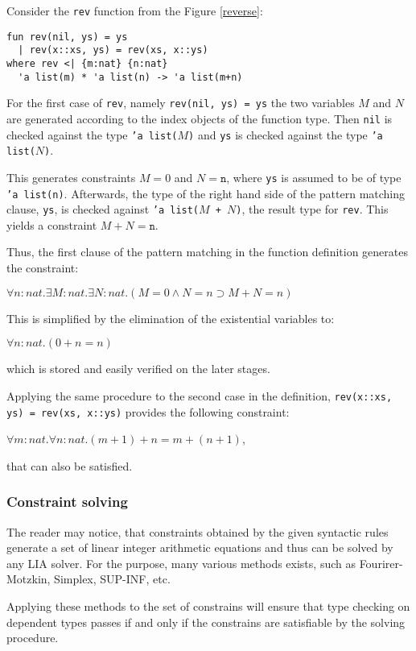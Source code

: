 \documentclass[a4paper,UKenglish]{lipics-v2016}
\begin{document}
Consider the \texttt{rev} function from the Figure \ref{reverse}:
\begin{verbatim}
fun rev(nil, ys) = ys
  | rev(x::xs, ys) = rev(xs, x::ys)
where rev <| {m:nat} {n:nat}
  'a list(m) * 'a list(n) -> 'a list(m+n)
\end{verbatim}

For the first case of \texttt{rev}, namely \texttt{rev(nil, ys) = ys} the two
variables $M$ and $N$ are generated according to the index objects of the
function type.  Then \texttt{nil} is checked against the type \texttt{'a
list($M$)} and \texttt{ys} is checked against the type \texttt{'a list($N$)}.

This generates constraints $M = 0$ and $N = \texttt{n}$, where \texttt{ys} is
assumed to be of type \texttt{'a list(n)}. Afterwards, the type of the right
hand side of the pattern matching clause, \texttt{ys}, is checked against
\texttt{'a list($M$ + $N$)}, the result type for \texttt{rev}. This yields a
constraint $M + N = \texttt{n}$.

Thus, the first clause of the pattern matching in the function definition
generates the constraint:

$\forall n : nat. \exists M : nat. \exists N : nat. (M = 0 \land N = n \supset M + N = n)$

This is simplified by the elimination of the existential variables to:

$\forall n : nat. (0 + n = n)$

which is stored and easily verified on the later stages.

Applying the same procedure to the second case in the definition,
\texttt{rev(x::xs, ys) = rev(xs, x::ys)} provides the following constraint:

$\forall m : nat. \forall n : nat.(m + 1) + n = m + (n + 1)$,

that can also be satisfied.

\subsubsection{Constraint solving}

The reader may notice, that constraints obtained by the given syntactic rules
generate a set of linear integer arithmetic equations and thus can be solved by
any LIA solver. For the purpose, many various methods exists, such as
Fourirer-Motzkin, Simplex, SUP-INF, etc.

Applying these methods to the set of constrains will ensure that type checking
on dependent types passes if and only if the constrains are satisfiable by the
solving procedure.
\end{document}
